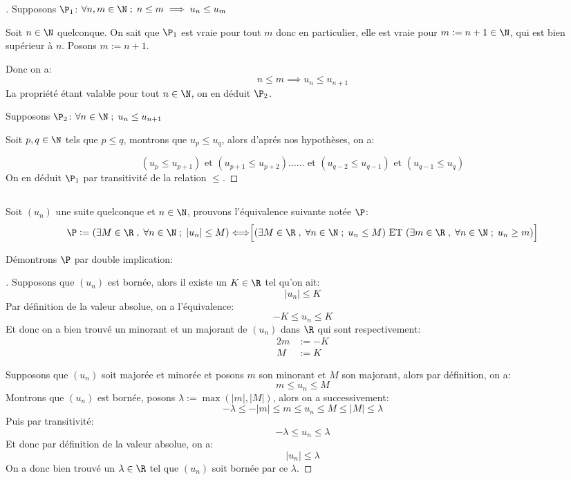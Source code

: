 \begin{proof}[\unskip\nopunct]
\boxed{\implies} Supposons \(\P_1\): \(\forall n,m \in \N\; ; \; n \leq m \implies u_n \leq u_m\)\<

Soit \(n \in \N\) quelconque. On sait que \(\P_1\) est vraie pour tout \(m\) donc en particulier, elle est vraie pour \(m := n + 1 \in \N\), qui est bien supérieur à \(n\). Posons \(m := n + 1\).

Donc on a:
\[
   n \leq m \implies u_n \leq u_{n + 1}
\]
La propriété étant valable pour tout \(n \in \N\), on en déduit \(\P_2\).\<

\boxed{\impliedby} Supposons \(\P_2\): \(\forall n \in \N\; ; \; u_n \leq u_{n+1}\)\< 

Soit \(p, q \in \N\) tels que \(p \leq q\), montrons que \(u_p \leq u_q\), alors d'aprés nos hypothèses, on a:

\[
   (u_p \leq u_{p+1}) \text{ et } (u_{p+1} \leq u_{p+2})\ldots\ldots \text{ et } (u_{q-2} \leq u_{q-1}) \text{ et } (u_{q-1} \leq u_{q})    
\]
On en déduit \(\P_1\) par transitivité de la relation \(\leq\).
\end{proof}

\subsection[Toute suite bornée est majorée et minorée]{}
Soit \((u_n)\) une suite quelconque et \(n \in \N\), prouvons l'équivalence suivante notée \(\P\):
\[
   \P:= (\exists M \in \R \; , \; \forall n \in \N \; ; \; |u_n| \leq M) \Longleftrightarrow \Bigr[(\exists M \in \R \; , \; \forall n \in \N \; ; \; u_n \leq M) \text{ ET } (\exists m \in \R \; , \; \forall n \in \N \; ; \; u_n \geq m)\Bigr]
\]

Démontrons \(\P\) par double implication:

\begin{proof}[\unskip\nopunct]
   \boxed{\implies} Supposons que \((u_n)\) est bornée, alors il existe un \(K \in \R\) tel qu'on ait:
   \[
      |u_n| \leq K
   \]
   Par définition de la valeur absolue, on a l'équivalence:
   \[
      -K \leq u_n \leq K
   \]
   Et donc on a bien trouvé un minorant et un majorant de \((u_n)\) dans \(\R\) qui sont respectivement:
   \begin{alignat*}{2}
      m &:= -K \\
      M &:= K
   \end{alignat*}

   \boxed{\implies} Supposons que \((u_n)\) soit majorée et minorée et posons \(m\) son minorant et \(M\) son majorant, alors par définition, on a:
   \[
      m \leq u_n \leq M
   \]
   Montrons que \((u_n)\) est bornée, posons \(\lambda := \max(|m|, |M|)\), alors on a successivement:
   \[
      -\lambda \leq - |m| \leq \boxed{m \leq u_n \leq M} \leq |M| \leq \lambda
   \]
   Puis par transitivité:
   \[
      -\lambda \leq u_n \leq \lambda      
   \]
   Et donc par définition de la valeur absolue, on a:
   \[
      |u_n| \leq \lambda
   \]
   On a donc bien trouvé un \(\lambda \in \R\) tel que \((u_n)\) soit bornée par ce \(\lambda\).
\end{proof}

